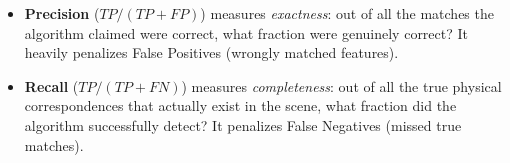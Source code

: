 {
\begin{itemize}
    \item \textbf{Precision} ($TP / (TP + FP)$) measures \textit{exactness}: out of all the matches the algorithm claimed were correct, what fraction were genuinely correct? It heavily penalizes False Positives (wrongly matched features).
    \item \textbf{Recall} ($TP / (TP + FN)$) measures \textit{completeness}: out of all the true physical correspondences that actually exist in the scene, what fraction did the algorithm successfully detect? It penalizes False Negatives (missed true matches).
\end{itemize}}